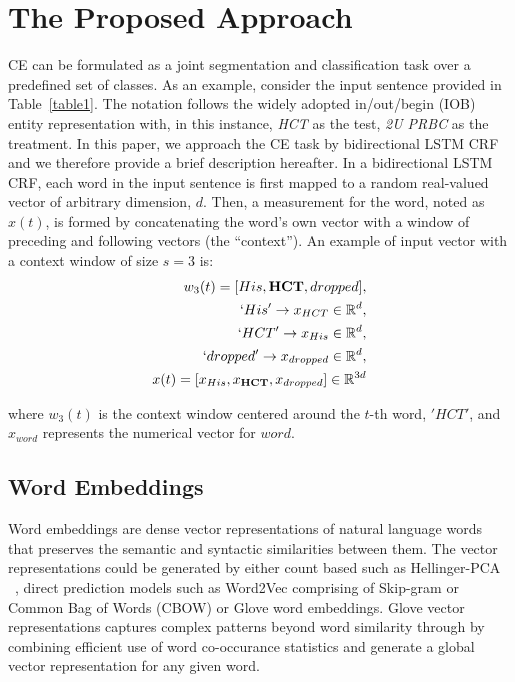 \documentclass[11pt]{article}
\begin{document}
\section{ The Proposed Approach}
CE can be formulated as a joint segmentation and classification task over a predefined set of classes. As an example, consider the input sentence provided in Table~\ref{table1}. The notation follows the widely adopted in/out/begin (IOB) entity representation with, in this instance, \textit{HCT} as the test, \textit{2U PRBC} as the treatment. In this paper, we approach the CE task by bidirectional LSTM CRF and we therefore provide a brief description hereafter. In a bidirectional LSTM CRF, each word in the input sentence is first mapped to a random real-valued  vector of arbitrary dimension, $d$. Then, a measurement for the word, noted as $x(t)$, is formed by concatenating the word's own vector with a window of preceding and following vectors (the ``context''). An example of input vector with a context window of size $s = 3$ is:
\begin{equation}
	\begin{split}
		w_{3}(t) = [His, \textbf{HCT}, dropped], \\
		`His' \rightarrow x_{HCT} \in \mathbb{R}^{d}, \\
		`HCT' \rightarrow x_{His} \in \mathbb{R}^{d}, \\
		`dropped' \rightarrow x_{dropped} \in \mathbb{R}^{d}, \\
		x(t) = [x_{His}, x_{\textbf{HCT}}, x_{dropped}] \in \mathbb{R}^{3d}
	\end{split}
\end{equation}

\noindent where $w_{3}(t)$ is the context window centered around the $t$-th word, $'HCT'$, and $x_{word}$ represents the numerical vector for $word$. 


\subsection{Word Embeddings}
Word embeddings are  dense vector  representations of natural language words that preserves the semantic and syntactic similarities between them. The vector representations could be generated by either count based such as Hellinger-PCA ~\cite{lebret2013word}, direct prediction models such as Word2Vec comprising of Skip-gram or Common Bag of Words (CBOW) or Glove word embeddings. Glove vector representations captures complex patterns beyond word similarity through by combining  efficient use of word co-occurance statistics and generate a global vector representation for any given word.
\end{document}
